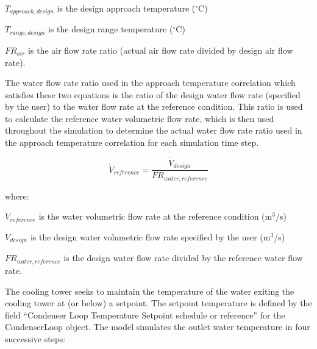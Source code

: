 \({T_{approach,design}}\) is the design approach temperature (\(^{\circ}\)C)

\({T_{range,design}}\) is the design range temperature (\(^{\circ}\)C)

\(F{R_{air}}\) is the air flow rate ratio (actual air flow rate divided by design air flow rate).

The water flow rate ratio used in the approach temperature correlation which satisfies these two equations is the ratio of the design water flow rate (specified by the user) to the water flow rate at the reference condition. This ratio is used to calculate the reference water volumetric flow rate, which is then used throughout the simulation to determine the actual water flow rate ratio used in the approach temperature correlation for each simulation time step.

\begin{equation}
{\dot V_{reference}} = \frac{{{{\dot V}_{design}}}}{{F{R_{water,reference}}}}
\end{equation}

where:

\({\dot V_{reference}}\) is the water volumetric flow rate at the reference condition (m\(^{3}\)/s)

\({\dot V_{design}}\) is the design water volumetric flow rate specified by the user (m\(^{3}\)/s)

\(F{R_{water,reference}}\) is the design water flow rate divided by the reference water flow rate.

The cooling tower seeks to maintain the temperature of the water exiting the cooling tower at (or below) a setpoint. The setpoint temperature is defined by the field ``Condenser Loop Temperature Setpoint schedule or reference'' for the CondenserLoop object. The model simulates the outlet water temperature in four successive steps:

